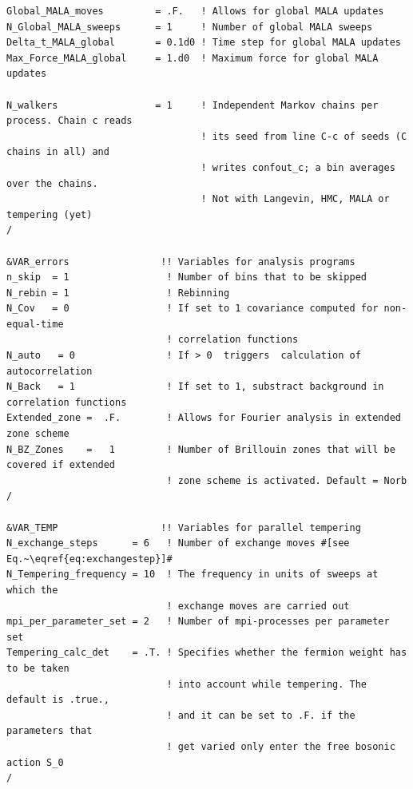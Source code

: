 \begin{lstlisting}[style=fortran,escapechar=\#,breaklines=true]
Global_MALA_moves         = .F.   ! Allows for global MALA updates
N_Global_MALA_sweeps      = 1     ! Number of global MALA sweeps
Delta_t_MALA_global       = 0.1d0 ! Time step for global MALA updates
Max_Force_MALA_global     = 1.d0  ! Maximum force for global MALA updates

N_walkers                 = 1     ! Independent Markov chains per process. Chain c reads
                                  ! its seed from line C-c of seeds (C chains in all) and
                                  ! writes confout_c; a bin averages over the chains.
                                  ! Not with Langevin, HMC, MALA or tempering (yet)
/

&VAR_errors                !! Variables for analysis programs
n_skip  = 1                 ! Number of bins that to be skipped
N_rebin = 1                 ! Rebinning  
N_Cov   = 0                 ! If set to 1 covariance computed for non-equal-time
                            ! correlation functions
N_auto   = 0                ! If > 0  triggers  calculation of autocorrelation 
N_Back   = 1                ! If set to 1, substract background in correlation functions
Extended_zone =  .F.        ! Allows for Fourier analysis in extended zone scheme 
N_BZ_Zones    =   1         ! Number of Brillouin zones that will be covered if extended 
                            ! zone scheme is activated. Default = Norb
/  

&VAR_TEMP                  !! Variables for parallel tempering
N_exchange_steps      = 6   ! Number of exchange moves #[see Eq.~\eqref{eq:exchangestep}]#
N_Tempering_frequency = 10  ! The frequency in units of sweeps at which the
                            ! exchange moves are carried out
mpi_per_parameter_set = 2   ! Number of mpi-processes per parameter set
Tempering_calc_det    = .T. ! Specifies whether the fermion weight has to be taken
                            ! into account while tempering. The default is .true.,
                            ! and it can be set to .F. if the parameters that
                            ! get varied only enter the free bosonic action S_0
/


\end{lstlisting}
